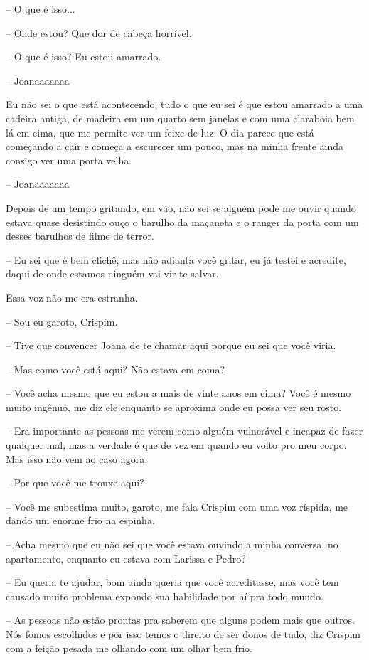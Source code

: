 -- O que é isso...

-- Onde estou? Que dor de cabeça horrível.

-- O que é isso? Eu estou amarrado.

-- Joanaaaaaaa

Eu não sei o que está acontecendo, tudo o que eu sei é que estou amarrado a uma cadeira antiga, de madeira em um quarto sem janelas e com uma claraboia bem lá em cima, que me permite ver um feixe de luz. O dia parece que está começando a cair e começa a escurecer um pouco, mas na minha frente ainda consigo ver uma porta velha.

-- Joanaaaaaaa

Depois de um tempo gritando, em vão, não sei se alguém pode me ouvir quando estava quase desistindo ouço o barulho da maçaneta e o ranger da porta com um desses barulhos de filme de terror.

-- Eu sei que é bem clichê, mas não adianta você gritar, eu já testei e acredite, daqui de onde estamos ninguém vai vir te salvar.

Essa voz não me era estranha.

-- Sou eu garoto, Crispim.

-- Tive que convencer Joana de te chamar aqui porque eu sei que você viria.

-- Mas como você está aqui? Não estava em coma?

-- Você acha mesmo que eu estou a mais de vinte anos em cima? Você é mesmo muito ingênuo, me diz ele enquanto se aproxima onde eu possa ver seu rosto.

-- Era importante as pessoas me verem como alguém vulnerável e incapaz de fazer qualquer mal, mas a verdade é que de vez em quando eu volto pro meu corpo. Mas isso não vem ao caso agora.

-- Por que você me trouxe aqui?

-- Você me subestima muito, garoto, me fala Crispim com uma voz ríspida, me dando um enorme frio na espinha.

-- Acha mesmo que eu não sei que você estava ouvindo a minha conversa, no apartamento, enquanto eu estava com Larissa e Pedro?

-- Eu queria te ajudar, bom ainda queria que você acreditasse, mas você tem causado muito problema expondo sua habilidade por aí pra todo mundo.

-- As pessoas não estão prontas pra saberem que alguns podem mais que outros. Nós fomos escolhidos e por isso temos o direito de ser donos de tudo, diz Crispim com a feição pesada me olhando com um olhar bem frio.

